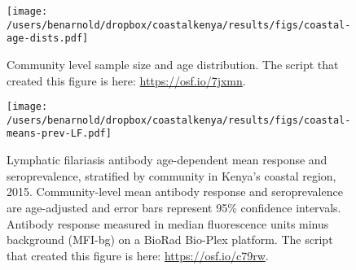\documentclass[11pt]{article}
\begin{document}
\begin{figure}[htbp]
\begin{center}
\texttt{[image: /users/benarnold/dropbox/coastalkenya/results/figs/coastal-age-dists.pdf]} 
\begin{minipage}{0.75\textwidth}
\caption{Community level sample size and age distribution. The script that created this figure is here: \url{https://osf.io/7jxmn}.}
\label{fig:agedist}
\end{minipage}
\end{center}
\end{figure}


\begin{landscape}
\begin{figure}[htbp]
\begin{center}
\texttt{[image: /users/benarnold/dropbox/coastalkenya/results/figs/coastal-means-prev-LF.pdf]} 
\begin{minipage}{1.2\textwidth}
\caption{Lymphatic filariasis antibody age-dependent mean response and seroprevalence, stratified by community in Kenya's coastal region, 2015. Community-level mean antibody response and seroprevalence are age-adjusted and error bars represent 95\% confidence intervals. Antibody response measured in median fluorescence units minus background (MFI-bg) on a BioRad Bio-Plex platform. The script that created this figure is here: \url{https://osf.io/c79rw}. \label{fig:LFbigfig}}
\end{minipage}
\end{center}
\end{figure}
\end{landscape}
\end{document}

